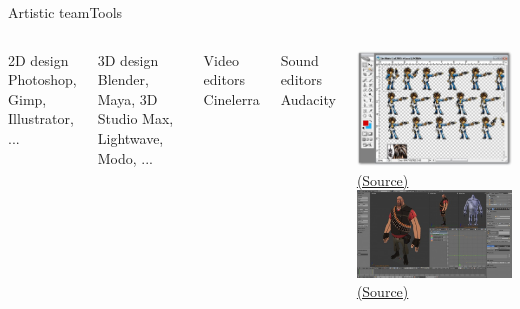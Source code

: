 \documentclass[10pt,compress]{beamer} %
\begin{document}
\begin{frame}{Artistic team}{Tools}
	\vspace{-0.2cm}
    \begin{columns}
	   \begin{block}{2D design}
			Photoshop, Gimp, Illustrator, ...
		\end{block}
	   \begin{block}{3D design}
			Blender, Maya, 3D Studio Max, Lightwave, Modo, ...
		\end{block}
		\begin{block}{Video editors}
			Cinelerra
		\end{block}
	   \begin{block}{Sound editors}
			Audacity
		\end{block}
	   \tiny
	   \begin{center}
		\includegraphics[width=0.8\linewidth]{figs/sshot-6}\\
		\href{http://chrisfucktheworld.blogspot.com.es/2009/06/como-hacer-animaciones-gif-con-adobe.html}{(Source)}\\
		\includegraphics[width=0.8\linewidth]{figs/blender}\\
		\href{http://wiki.ikaslab.org/index.php/Dise\%C3\%B1o_3D}{(Source)}
		\end{center}
	\end{columns}
\end{frame}
\end{document}
